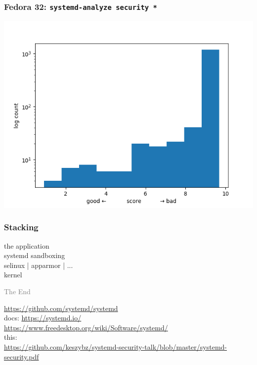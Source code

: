 \documentclass[serif]{beamer}
\begin{document}
\begin{frame}
  \frametitle{Fedora 32: \texttt{systemd-analyze security *}}

  \includegraphics[width=\textwidth]{images/fedora-scores.png}
\end{frame}

\begin{frame}
  \frametitle{Stacking}

  the application\\
  systemd sandboxing\\
  selinux | apparmor | ...\\
  kernel
\end{frame}


\begin{frame}[fragile]
  \textcolor{gray}{The End}

  \bigskip

  \url{https://github.com/systemd/systemd}\\
  docs: \url{https://systemd.io/}\\
  \phantom{docs: }\url{https://www.freedesktop.org/wiki/Software/systemd/}\hspace*{-5cm}\\

  \medskip
  this:\\
  \url{https://github.com/keszybz/systemd-security-talk/blob/master/systemd-security.pdf}
\end{frame}
\end{document}
